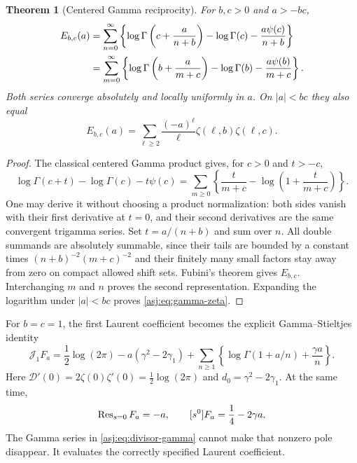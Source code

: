 \documentclass[11pt]{article}
\numberwithin{equation}{section}
\newtheorem{theorem}{Theorem}[section]
\theoremstyle{definition}\newtheorem{definition}[theorem]{Definition}
\theoremstyle{remark}\newtheorem{remark}[theorem]{Remark}\newtheorem{example}[theorem]{Example}
\newcommand{\D}{\mathscr D}\newcommand{\calH}{\mathcal H}\newcommand{\calR}{\mathcal R}
\newcommand{\calJ}{\mathcal J}\newcommand{\calZ}{\mathcal Z}
\begin{document}
\begin{theorem}[Centered Gamma reciprocity]\label{asj:thm:gamma}
For $b,c>0$ and $a>-bc$,
\begin{align}\label{asj:eq:gamma-reciprocity}
 E_{b,c}(a)
 &=\sum_{n=0}^{\infty}\left\{
       \log\Gamma\left(c+\frac a{n+b}\right)-\log\Gamma(c)
                      -\frac{a\psi(c)}{n+b}\right\}\notag\\
 &=\sum_{m=0}^{\infty}\left\{
       \log\Gamma\left(b+\frac a{m+c}\right)-\log\Gamma(b)
                      -\frac{a\psi(b)}{m+c}\right\}.
\end{align}
Both series converge absolutely and locally uniformly in $a$. On
$|a|<bc$ they also equal
\begin{equation}\label{asj:eq:gamma-zeta}
 E_{b,c}(a)=\sum_{\ell\ge2}
                 \frac{(-a)^\ell}{\ell}\zeta(\ell,b)\zeta(\ell,c).
\end{equation}
\end{theorem}
\begin{proof}
The classical centered Gamma product gives, for $c>0$ and $t>-c$,
\begin{equation}\label{asj:eq:centeredgamma}
 \log\Gamma(c+t)-\log\Gamma(c)-t\psi(c)
    =\sum_{m\ge0}\left\{\frac{t}{m+c}
                         -\log\left(1+\frac t{m+c}\right)\right\}.
\end{equation}
One may derive it without choosing a product normalization: both sides
vanish with their first derivative at $t=0$, and their second derivatives
are the same convergent trigamma series. Set $t=a/(n+b)$ and sum over
$n$. All double summands are absolutely summable, since their tails are
bounded by a constant times $(n+b)^{-2}(m+c)^{-2}$ and their finitely many
small factors stay away from zero on compact allowed shift sets.
Fubini's theorem gives $E_{b,c}$. Interchanging $m$ and $n$ proves the
second representation. Expanding the logarithm under $|a|<bc$ proves
\eqref{asj:eq:gamma-zeta}.
\end{proof}

For $b=c=1$, the first Laurent coefficient becomes the explicit
Gamma--Stieltjes identity
\begin{equation}\label{asj:eq:divisor-gamma}
 \calJ_1F_a=\frac12\log(2\pi)-a(\gamma^2-2\gamma_1)
      +\sum_{n\ge1}\left\{\log\Gamma(1+a/n)+\frac{\gamma a}{n}\right\}.
\end{equation}
Here $\D'(0)=2\zeta(0)\zeta'(0)=\tfrac12\log(2\pi)$ and
$d_0=\gamma^2-2\gamma_1$. At the same time,
\[
 \operatorname{Res}_{s=0}F_a=-a,\qquad [s^0]F_a=\frac14-2\gamma a.
\]
The Gamma series in \eqref{asj:eq:divisor-gamma} cannot make that nonzero pole
 disappear. It evaluates the correctly specified Laurent coefficient.
\end{document}
